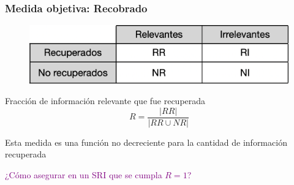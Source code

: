 \documentclass[
10pt, %
aspectratio=169, %
]{beamer}
\begin{document}
	\begin{frame}
		
		\frametitle{Medida objetiva: Recobrado}
		
		\begin{figure}[tl]
			\centering
			\includegraphics[scale=0.35]{matriz-peq.png}
		\end{figure}
		
		\vspace{2\baselineskip}
		
		\centering
		Fracción de información relevante que fue recuperada
		$$R = \frac{|RR|}{|RR \cup NR|}$$
		
		Esta medida es una función no decreciente para la cantidad de información recuperada
		
		\pause
		\vspace{3\baselineskip}
		\textcolor{purple}{¿Cómo asegurar en un SRI que se cumpla $R=1$?}
		
	\end{frame}
	
\end{document}
